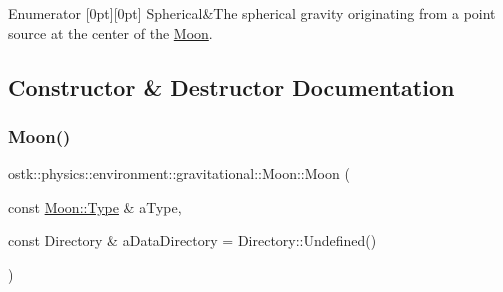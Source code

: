 \begin{DoxyEnumFields}{Enumerator}
[0pt][0pt]{}\mbox{\label{classostk_1_1physics_1_1environment_1_1gravitational_1_1_moon_a09ec881799f85fdef3547ef443d57c27a24e5c24fabd1c081d4c729094df0b947}} 
Spherical&The spherical gravity originating from a point source at the center of the \hyperlink{classostk_1_1physics_1_1environment_1_1gravitational_1_1_moon}{Moon}. \\
\hline

\end{DoxyEnumFields}


\subsection{Constructor \& Destructor Documentation}
\mbox{\label{classostk_1_1physics_1_1environment_1_1gravitational_1_1_moon_a3efd035ca7e61e851a930580ff73bb84}} 
\subsubsection{\texorpdfstring{Moon()}{Moon()}\hspace{0.1cm}{\footnotesize\ttfamily [1/2]}}
{\footnotesize\ttfamily ostk\+::physics\+::environment\+::gravitational\+::\+Moon\+::\+Moon (\begin{DoxyParamCaption}\item[{const \hyperlink{classostk_1_1physics_1_1environment_1_1gravitational_1_1_moon_a09ec881799f85fdef3547ef443d57c27}{Moon\+::\+Type} \&}]{a\+Type,  }\item[{const Directory \&}]{a\+Data\+Directory = {\ttfamily Directory\+:\+:Undefined()} }\end{DoxyParamCaption})}



